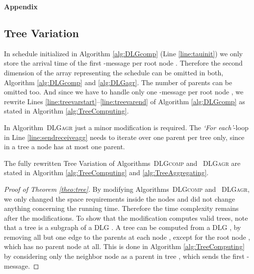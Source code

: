 \documentclass[11pt]{article}
\newif\iffull
\begin{document}
\fi







\begin{center}
\textbf{Appendix}
\end{center}



\subsection{Tree Variation}\label{app:tree}

In schedule  initialized in Algorithm \ref{alg:DLGcomp} (Line \ref{line:tauinit}) we only store the arrival time of the first -message per root node .
Therefore the second dimension of the array  representing the schedule can be omitted in both, Algorithm \ref{alg:DLGcomp} and \ref{alg:DLGagr}.
The number of parents  can be omitted too.
And since we have to handle only one -message per root node , we rewrite Lines \ref{line:treevarstart}--\ref{line:treevarend} of Algorithm \ref{alg:DLGcomp} as stated in Algorithm \ref{alg:TreeComputing}.


In Algorithm\iffull~\ref{alg:DLGagr}\fi~\textsc{DLGagr} just a minor modification is required. 
The \textit{`For each'}-loop in Line \ref{line:sendreceiveagg} needs to iterate over one parent  per tree  only, since in a tree a node has at most one parent.

The fully rewritten Tree Variation of Algorithms\iffull~\ref{alg:DLGcomp}\fi~\textsc{DLGcomp} and \iffull~\ref{alg:DLGagr}\fi~\textsc{DLGagr} are stated in Algorithm \ref{alg:TreeComputing} and \ref{alg:TreeAggregating}.


\begin{proof}[Proof of Theorem \ref{theo:tree}]
By modifying Algorithms\iffull~\ref{alg:DLGcomp}\fi~\textsc{DLGcomp} and \iffull~\ref{alg:DLGagr}\fi~\textsc{DLGagr}, we only changed the space requirements inside the nodes  and did not change anything concerning the running time. Therefore the time complexity remains   after the modifications.
To show that the modification computes valid trees, note that a tree  is a subgraph of a DLG . A tree  can be computed from a DLG , by removing all but one edge to the parents at each node , except for the root node , which has no parent node at all. This is done in Algorithm \ref{alg:TreeComputing} by considering only the neighbor node  as a parent in tree , which sends the first -message.
\end{proof}
\end{document}
